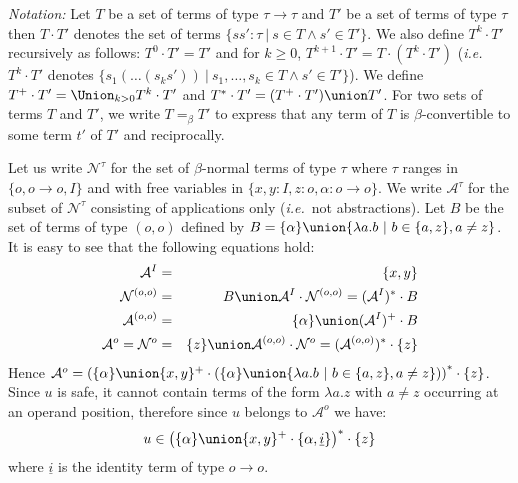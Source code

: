 \emph{Notation:} Let $T$ be a set of terms of type $\tau \rightarrow
\tau$ and $T'$ be a set of terms of type $\tau$ then $T \cdot T'$
denotes the set of terms $\{ s s' : \tau \ | \ s \in T \wedge s' \in
T' \}$. We also define $T^k \cdot T'$ recursively as follows:  $T^0
\cdot T' = T'$ and for $k\geq 0$, $T^{k+1} \cdot T' = T \cdot (T^k
\cdot T')$ ({\it i.e.}~$T^k \cdot T'$ denotes $\{ s_1( \ldots (s_k
s'))  \ | \ s_1, \ldots, s_k \in T \wedge s' \in T' \}$). We define
$T^+\cdot T' = \Union_{k > 0} T^k \cdot T'$ and $T^*\cdot T' =
(T^+\cdot T') \union T'$. For two sets of terms $T$ and $T'$, we
write $T =_\beta T'$ to express that any term of $T$ is
$\beta$-convertible to some term $t'$ of $T'$ and reciprocally.

Let us write $\mathcal{N}^\tau$ for the set of $\beta$-normal terms
of type $\tau$ where $\tau$ ranges in $\{ o, o\rightarrow o, I \}$
and with free variables in $\{ x,y:I, z:o, \alpha:o\rightarrow o\}$.
We write $\mathcal{A}^\tau$ for the subset of $\mathcal{N}^\tau$
consisting of applications only ({\it i.e.}~not abstractions). Let
$B$ be the set of terms of type $(o,o)$ defined by $B = \{ \alpha \}
\union \{ \lambda a.b \ | \ b \in \{a,z\}, a \neq z \}$. It is easy
to see that the following equations hold:
\begin{eqnarray*}
\mathcal{A}^I &=& \{ x,y \} \\
\mathcal{N}^{(o,o)} &=& B \union \mathcal{A}^I \cdot
\mathcal{N}^{(o,o)} = (\mathcal{A}^I)^* \cdot B \\
\mathcal{A}^{(o,o)} &=& \{ \alpha \} \union (\mathcal{A}^I)^+ \cdot B \\
\mathcal{A}^o = \mathcal{N}^o &=& \{ z \} \union \mathcal{A}^{(o,o)} \cdot \mathcal{N}^o = (\mathcal{A}^{(o,o)})^* \cdot \{ z \}
\end{eqnarray*}
Hence $\mathcal{A}^o = \left( \{\alpha \} \union \{x,y\}^+ \cdot
\left( \{\alpha \} \union \{\lambda a.b \ | \ b \in \{a,z\}, a \neq
z \} \right) \right)^* \cdot \{ z \}$. Since $u$ is safe, it cannot
contain terms of the form $\lambda a . z$ with $a \neq z$ occurring
at an operand position, therefore since $u$ belongs to
$\mathcal{A}^o$ we have:
\begin{equation}
u \in \left( \{\alpha\} \union \{x,y\}^+ \cdot \{\alpha,
\underline{i} \} \right)^* \cdot \{ z \} \label{eqn:u}
\end{equation}
where $\underline{i}$ is the identity term of type $o\rightarrow o$.


